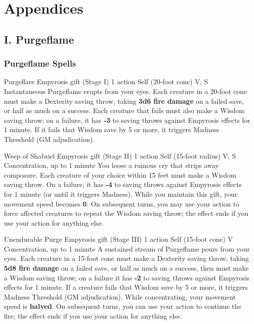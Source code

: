 \documentclass[letterpaper,twocolumn,openany,nodeprecatedcode,breakable,skins,xparse,most]{dndbook}
\begin{document}
\chapter*{Appendices}

\section{I. Purgeflame}
\subsection{Purgeflame Spells}

\DndSpellHeader%
  {Purgeflare}
  {Empyrosis gift (Stage I)}
  {1 action}
  {Self (20-foot cone)}
  {V, S}
  {Instantaneous}
Purgeflame erupts from your eyes. Each creature in a 20-foot cone must make a Dexterity saving throw, taking \textbf{3d6 fire damage} on a failed save, or half as much on a success. Each creature that fails must also make a Wisdom saving throw; on a failure, it has \textbf{-3} to saving throws against Empyrosis effects for 1 minute. If it fails that Wisdom save by 5 or more, it triggers Madness Threshold (GM adjudication).

\medskip

\DndSpellHeader%
  {Weep of Shabriel}
  {Empyrosis gift (Stage II)}
  {1 action}
  {Self (15-foot radius)}
  {V, S}
  {Concentration, up to 1 minute}
You loose a ruinous cry that strips away composure. Each creature of your choice within 15 feet must make a Wisdom saving throw. On a failure, it has \textbf{-4} to saving throws against Empyrosis effects for 1 minute (or until it triggers Madness). While you maintain this gift, your movement speed becomes \textbf{0}. On subsequent turns, you may use your action to force affected creatures to repeat the Wisdom saving throw; the effect ends if you use your action for anything else.

\DndSpellHeader%
  {Unendurable Purge}
  {Empyrosis gift (Stage III)}
  {1 action}
  {Self (15-foot cone)}
  {V}
  {Concentration, up to 1 minute}
A sustained stream of Purgeflame pours from your eyes. Each creature in a 15-foot cone must make a Dexterity saving throw, taking \textbf{5d8 fire damage} on a failed save, or half as much on a success, then must make a Wisdom saving throw; on a failure it has \textbf{-2} to saving throws against Empyrosis effects for 1 minute. If a creature fails that Wisdom save by 5 or more, it triggers Madness Threshold (GM adjudication). While concentrating, your movement speed is \textbf{halved}. On subsequent turns, you can use your action to continue the fire; the effect ends if you use your action for anything else.
\end{document}

